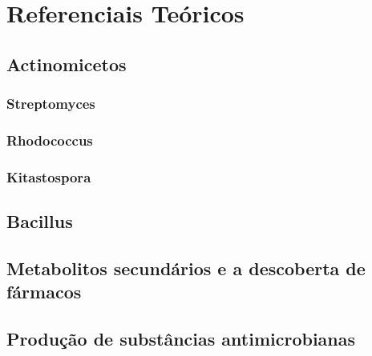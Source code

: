 \chapter{Referenciais Teóricos}
\label{cap:referenciais_teoricos}




\section{Actinomicetos}
\subsection{Streptomyces}
\subsection{Rhodococcus}
\subsection{Kitastospora}
\section{Bacillus}
\section{Metabolitos secundários e a descoberta de fármacos}
\section{Produção de substâncias antimicrobianas}
